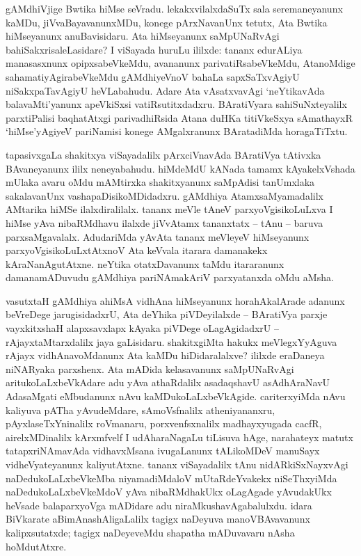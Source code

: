 gAMdhiVjige Bwtika hiMse seVradu. lekakxvilalxdaSuTx sala seremaneyanunx kaMDu, jiVvaBayavanunxMDu, konege pArxNavanUnx tetutx, Ata Bwtika hiMseyanunx anuBavisidaru. Ata hiMseyanunx saMpUNaRvAgi bahiSakxrisaleLasidare? I viSayada huruLu ililxde: tananx edurALiya manasasxnunx opipxsabeVkeMdu, avananunx parivatiRsabeVkeMdu, AtanoMdige sahamatiyAgirabeVkeMdu gAMdhiyeVnoV bahaLa sapxSaTxvAgiyU niSakxpaTavAgiyU heVLabahudu. Adare Ata vAsatxvavAgi `neYtikavAda balavaMti'yanunx apeVkiSxsi vatiRsutitxdadxru. BAratiVyara sahiSuNxteyalilx parxtiPalisi baqhatAtxgi parivadhiRsida Atana duHKa titiVkeSxya sAmathayxR `hiMse'yAgiyeV pariNamisi konege AMgalxranunx BAratadiMda horagaTiTxtu.

tapasivxgaLa shakitxya viSayadalilx pArxciVnavAda BAratiVya tAtivxka BAvaneyanunx ililx neneyabahudu. hiMdeMdU kANada tamamx kAyakelxVshada mUlaka avaru oMdu mAMtirxka shakitxyanunx saMpAdisi tanUmxlaka sakalavanUnx vashapaDisikoMDidadxru. gAMdhiya AtamxsaMyamadalilx AMtarika hiMSe ilalxdiralilalx. tananx meVle tAneV parxyoVgisikoLuLxva I hiMse yAva nibaRMdhavu ilalxde jiVvAtamx tananxtatx -- tAnu -- baruva parxsaMgavalalx. AdudariMda yAvAta tananx meVleyeV hiMseyanunx parxyoVgisikoLuLxtAtxnoV Ata keVvala itarara damanakekx kAraNanAgutAtxne. neYtika otatxDavanunx taMdu itararanunx damanamADuvudu gAMdhiya pariNAmakAriV parxyatanxda oMdu aMsha.

vasutxtaH gAMdhiya ahiMsA vidhAna hiMseyanunx horahAkalArade adanunx beVreDege jarugisidadxrU, Ata deYhika piVDeyilalxde -- BAratiVya parxje vayxkitxshaH alapxsavxlapx kAyaka piVDege oLagAgidadxrU -- rAjayxtaMtarxdalilx jaya gaLisidaru. shakitxgiMta hakukx meVlegxYyAguva rAjayx vidhAnavoMdanunx Ata kaMDu hiDidaralalxve? ililxde eraDaneya niNARyaka parxshenx. Ata mADida kelasavanunx saMpUNaRvAgi aritukoLaLxbeVkAdare adu yAva athaRdalilx asadaqshavU asAdhAraNavU AdasaMgati eMbudanunx nAvu kaMDukoLaLxbeVkAgide. cariterxyiMda nAvu kaliyuva pATha yAvudeMdare, sAmoVsfnalilx atheniyananxru, pAyxlaseTxYninalilx roVmanaru, porxvenfsxnalilx madhayxyugada cacfR, airelxMDinalilx kArxmfvelf I udAharaNagaLu tiLisuva hAge, narahateyx matutx tatapxriNAmavAda vidhavxMsana ivugaLanunx tALikoMDeV manuSayx vidheVyateyanunx kaliyutAtxne. tananx viSayadalilx tAnu nidARkiSxNayxvAgi naDedukoLaLxbeVkeMba niyamadiMdaloV mUtaRdeYvakekx niSeThxyiMda naDedukoLaLxbeVkeMdoV yAva nibaRMdhakUkx oLagAgade yAvudakUkx heVsade balaparxyoVga mADidare adu niraMkushavAgabalulxdu. idara BiVkarate aBimAnashAligaLalilx tagigx naDeyuva manoVBAvavanunx kalipxsutatxde; tagigx naDeyeveMdu shapatha mADuvavaru nAsha hoMdutAtxre.

